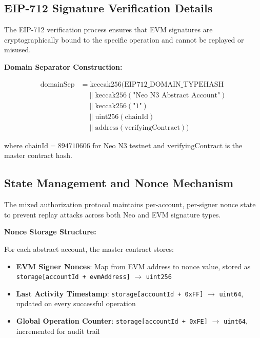 \documentclass[10pt,twocolumn]{article}
\newcommand{\code}[1]{\texttt{\small #1}}
\begin{document}
{\subsection{EIP-712 Signature Verification Details}

The EIP-712 verification process ensures that EVM signatures are cryptographically bound to the specific operation and cannot be replayed or misused.

\textbf{Domain Separator Construction:}

\begin{small}
\begin{align*}
\text{domainSep} &= \text{keccak256}(\text{EIP712\_DOMAIN\_TYPEHASH} \\
&\quad \| \text{keccak256}(\text{"Neo N3 Abstract Account"}) \\
&\quad \| \text{keccak256}(\text{"1"}) \\
&\quad \| \text{uint256}(\text{chainId}) \\
&\quad \| \text{address}(\text{verifyingContract}))
\end{align*}
\end{small}

where $\text{chainId} = 894710606$ for Neo N3 testnet and $\text{verifyingContract}$ is the master contract hash.


\subsection{State Management and Nonce Mechanism}

The mixed authorization protocol maintains per-account, per-signer nonce state to prevent replay attacks across both Neo and EVM signature types.

\textbf{Nonce Storage Structure:}

For each abstract account, the master contract stores:
\begin{itemize}[leftmargin=*,topsep=2pt,itemsep=1pt]
\item \textbf{EVM Signer Nonces}: Map from EVM address to nonce value, stored as \code{storage[accountId + evmAddress]} $\rightarrow$ \code{uint256}
\item \textbf{Last Activity Timestamp}: \code{storage[accountId + 0xFF]} $\rightarrow$ \code{uint64}, updated on every successful operation
\item \textbf{Global Operation Counter}: \code{storage[accountId + 0xFE]} $\rightarrow$ \code{uint64}, incremented for audit trail
\end{itemize}

}
\end{document}
